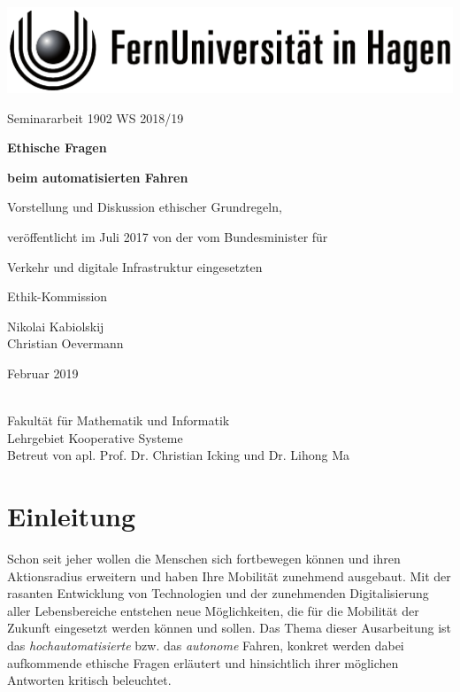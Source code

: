 \documentclass[twoside,a4paper,12pt]{article}
\begin{document}
\thispagestyle{empty}
\begin{center}
	\includegraphics[scale=1]{resources/fernunisignet-sw}
\end{center}
\vskip 2.5cm
\begin{center}
	{\Large Seminararbeit 1902 WS 2018/19\par}
	\vskip 2.5cm
	{\textbf{\Large Ethische Fragen} \par}    
	\vskip 0.2cm	
	{\textbf{\Large beim automatisierten Fahren} \par}    
	\vskip 1cm
	{\Large Vorstellung und Diskussion ethischer Grundregeln, \par}
	{\Large veröffentlicht im Juli 2017 von der vom Bundesminister für \par}
	{\Large Verkehr und digitale Infrastruktur eingesetzten \par}
	{\Large Ethik-Kommission \par}
	\vskip 1.5cm
	{\Large Nikolai Kabiolskij\\Christian Oevermann \par}
	\vskip 2cm
	\Large Februar 2019
\end{center}
\FUiH\\
Fakultät für Mathematik und Informatik\\
Lehrgebiet Kooperative Systeme\\
Betreut von apl. Prof. Dr. Christian Icking und Dr. Lihong Ma\\
  
\newpage
\tableofcontents


\listoffigures
\newpage


\section{Einleitung} \label{Einleitung}
Schon seit jeher wollen die Menschen sich fortbewegen können und ihren Aktionsradius erweitern und haben Ihre Mobilität zunehmend ausgebaut. Mit der rasanten
Entwicklung von Technologien und der zunehmenden Digitalisierung aller Lebensbereiche entstehen neue Möglichkeiten, die für die Mobilität der Zukunft eingesetzt 
werden können und sollen. Das Thema dieser Ausarbeitung ist das \textit{hochautomatisierte} bzw. das \textit{autonome} Fahren, konkret werden dabei aufkommende
ethische Fragen erläutert und hinsichtlich ihrer möglichen Antworten kritisch beleuchtet. 
\end{document}
